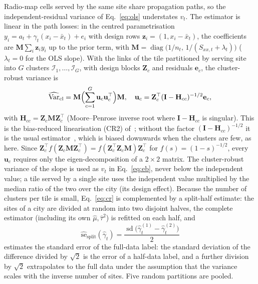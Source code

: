 Radio-map cells served by the same site share propagation paths, so the
independent-residual variance of Eq.~\eqref{eq:ols} understates $v_t$. The
estimator is linear in the path losses: in the centred parametrisation
$y_i=a_t+\gamma_t(x_i-\bar x_t)+e_i$ with design rows
$\mathbf{z}_i=(1,x_i-\bar x_t)$, the coefficients are
$\mathbf{M}\sum_i\mathbf{z}_i y_i$ up to the prior term, with
$\mathbf{M}=\operatorname{diag}\bigl(1/n_t,\,1/(S_{xx,t}+\lambda_t)\bigr)$
($\lambda_t=0$ for the OLS slope). With the links of the tile partitioned by
serving site into $G$ clusters $\mathcal{I}_1,\dots,\mathcal{I}_G$, with
design blocks $\mathbf{Z}_c$ and residuals $\mathbf{e}_c$, the
cluster-robust variance is
\begin{equation}
\widehat{\operatorname{Var}}_{\mathrm{cl}}=\mathbf{M}\Bigl(\sum_{c=1}^{G}\mathbf{u}_c\mathbf{u}_c^{\top}\Bigr)\mathbf{M},
\quad
\mathbf{u}_c=\mathbf{Z}_c^{\top}(\mathbf{I}-\mathbf{H}_{cc})^{-1/2}\mathbf{e}_c,
\label{eq:cr}
\end{equation}
with $\mathbf{H}_{cc}=\mathbf{Z}_c\mathbf{M}\mathbf{Z}_c^{\top}$ (Moore--Penrose
inverse root where $\mathbf{I}-\mathbf{H}_{cc}$ is singular). This is the
bias-reduced linearisation (CR2) of~\cite{bell2002,pustejovsky2018}; without
the factor $(\mathbf{I}-\mathbf{H}_{cc})^{-1/2}$ it is the usual
estimator~\cite{liang1986,cameron2015}, which is biased downwards when the
clusters are few, as here. Since
$\mathbf{Z}_c^{\top}f(\mathbf{Z}_c\mathbf{M}\mathbf{Z}_c^{\top})=f(\mathbf{Z}_c^{\top}\mathbf{Z}_c\mathbf{M})\mathbf{Z}_c^{\top}$
for $f(s)=(1-s)^{-1/2}$, every $\mathbf{u}_c$ requires only the
eigen-decomposition of a $2\times2$ matrix. The cluster-robust variance of
the slope is used as $v_t$ in Eq.~\eqref{eq:eb}, never below the
independent value; a tile served by a single site uses the independent
value multiplied by the median ratio of the two over the city (its design
effect). Because the number of clusters per tile is small,
Eq.~\eqref{eq:cr} is complemented by a split-half estimate: the sites of a
city are divided at random into two disjoint halves, the complete estimator
(including its own $\hat\mu,\hat\tau^2$) is refitted on each half, and
\begin{equation}
\widehat{\mathrm{se}}_{\mathrm{split}}(\hat\gamma_t)=
\frac{\operatorname{sd}\bigl(\hat\gamma_t^{(1)}-\hat\gamma_t^{(2)}\bigr)}{2}
\label{eq:split}
\end{equation}
estimates the standard error of the full-data label: the standard
deviation of the difference divided by $\sqrt2$ is the error of a half-data
label, and a further division by $\sqrt2$ extrapolates to the full data
under the assumption that the variance scales with the inverse number of
sites. Five random partitions are pooled.

